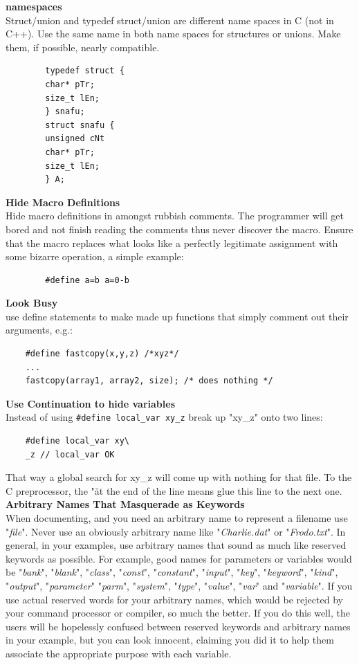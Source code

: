 \documentclass[11pt,twoside,a4paper]{article}
\begin{document}
\textbf{namespaces}~\\
Struct/union and typedef struct/union are different name spaces in C (not in C++). Use the same name in both name spaces for structures or unions. Make them, if possible, nearly compatible. 
	\begin{verbatim}
		typedef struct { 
		char* pTr; 
		size_t lEn; 
		} snafu; 
		struct snafu { 
		unsigned cNt 
		char* pTr; 
		size_t lEn; 
		} A; 
	\end{verbatim}

\textbf{Hide Macro Definitions}~\\
Hide macro definitions in amongst rubbish comments. The programmer will get bored and not finish reading the comments thus never discover the macro. Ensure that the macro replaces what looks like a perfectly legitimate assignment with some bizarre operation, a simple example: 
	\begin{verbatim}
		#define a=b a=0-b 
	\end{verbatim}

\textbf{Look Busy}~\\
use define statements to make made up functions that simply comment out their arguments, e.g.: 
\begin{verbatim}
	#define fastcopy(x,y,z) /*xyz*/ 
	... 
	fastcopy(array1, array2, size); /* does nothing */ 
\end{verbatim}

\textbf{Use Continuation to hide variables}~\\
Instead of using \texttt{\#define local\_var xy\_z} break up "xy\_z" onto two lines: 
\begin{verbatim}
	#define local_var xy\ 
	_z // local_var OK 
\end{verbatim}
That way a global search for xy\_z will come up with nothing for that file. To the C preprocessor, the "\" at the end of the line means glue this line to the next one.~\\ 

\textbf{Arbitrary Names That Masquerade as Keywords}~\\
When documenting, and you need an arbitrary name to represent a filename use "\emph{file}". Never use an obviously arbitrary name like "\emph{Charlie.dat}" or "\emph{Frodo.txt}". In general, in your examples, use arbitrary names that sound as much like reserved keywords as possible. For example, good names for parameters or variables would be "\emph{bank}", "\emph{blank}", "\emph{class}", "\emph{const}", "\emph{constant}", "\emph{input}", "\emph{key}", "\emph{keyword}", "\emph{kind}", "\emph{output}", "\emph{parameter}" "\emph{parm}", "\emph{system}", "\emph{type}", "\emph{value}", "\emph{var}" and "\emph{variable}". If you use actual reserved words for your arbitrary names, which would be rejected by your command processor or compiler, so much the better. If you do this well, the users will be hopelessly confused between reserved keywords and arbitrary names in your example, but you can look innocent, claiming you did it to help them associate the appropriate purpose with each variable.~\\ 
\end{document}
